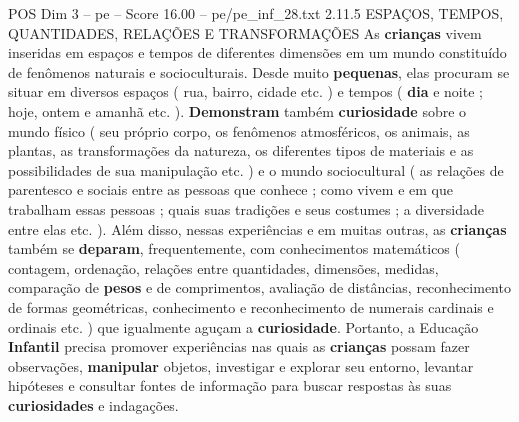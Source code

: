 \begin{textsample}{POS Dim 3 – pe – Score 16.00 – pe/pe\_inf\_28.txt}  \label{ex:f3_pos_276}
2.11.5 ESPAÇOS, TEMPOS, QUANTIDADES, RELAÇÕES E TRANSFORMAÇÕES As \textbf{crianças} vivem inseridas em espaços e tempos de diferentes dimensões em um mundo constituído de fenômenos naturais e socioculturais.
Desde muito \textbf{pequenas}, elas procuram se situar em diversos espaços ( rua, bairro, cidade etc. ) e tempos ( \textbf{dia} e noite ; hoje, ontem e amanhã etc. ). \textbf{Demonstram} também \textbf{curiosidade} sobre o mundo físico ( seu próprio corpo, os fenômenos atmosféricos, os animais, as plantas, as transformações da natureza, os diferentes tipos de materiais e as possibilidades de sua manipulação etc. ) e o mundo sociocultural ( as relações de parentesco e sociais entre as pessoas que conhece ; como vivem e em que trabalham essas pessoas ; quais suas tradições e seus costumes ; a diversidade entre elas etc. ).
Além disso, nessas experiências e em muitas outras, as \textbf{crianças} também se \textbf{deparam}, frequentemente, com conhecimentos matemáticos ( contagem, ordenação, relações entre quantidades, dimensões, medidas, comparação de \textbf{pesos} e de comprimentos, avaliação de distâncias, reconhecimento de formas geométricas, conhecimento e reconhecimento de numerais cardinais e ordinais etc. ) que igualmente aguçam a \textbf{curiosidade}.
Portanto, a Educação \textbf{Infantil} precisa promover experiências nas quais as \textbf{crianças} possam fazer observações, \textbf{manipular} objetos, investigar e explorar seu entorno, levantar hipóteses e consultar fontes de informação para buscar respostas às suas \textbf{curiosidades} e indagações.

\end{textsample}
